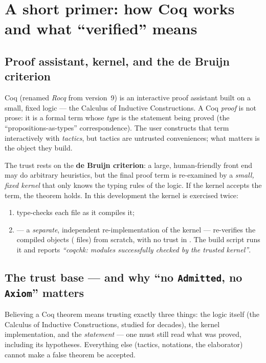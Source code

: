 \documentclass[11pt]{article}
\newcommand{\coq}[1]{\texttt{\detokenize{#1}}}
\begin{document}
\section{A short primer: how Coq works and what ``verified'' means}\label{sec:coq}

\subsection{Proof assistant, kernel, and the de Bruijn criterion}

Coq (renamed \emph{Rocq} from version~9) is an interactive proof assistant
built on a small, fixed logic --- the Calculus of Inductive Constructions. A
Coq \emph{proof} is not prose: it is a formal term whose \emph{type} is the
statement being proved (the ``propositions-as-types'' correspondence). The
user constructs that term interactively with \emph{tactics}, but tactics are
untrusted conveniences; what matters is the object they build.

The trust rests on the \textbf{de Bruijn criterion}: a large, human-friendly
front end may do arbitrary heuristics, but the final proof term is re-examined
by a \emph{small, fixed kernel} that only knows the typing rules of the logic.
If the kernel accepts the term, the theorem holds. In this development the
kernel is exercised twice:
\begin{enumerate}[nosep]
  \item \coq{coqc} type-checks each file as it compiles it;
  \item \coq{coqchk} --- a \emph{separate}, independent re-implementation of
    the kernel --- re-verifies the compiled objects (\coq{.vo} files) from
    scratch, with no trust in \coq{coqc}. The build script runs it and reports
    \emph{``coqchk: modules successfully checked by the trusted kernel''}.
\end{enumerate}

\subsection{The trust base --- and why ``no \texttt{Admitted}, no \texttt{Axiom}'' matters}

Believing a Coq theorem means trusting exactly three things: the logic itself
(the Calculus of Inductive Constructions, studied for decades), the kernel
implementation, and the \emph{statement} --- one must still read what was
proved, including its hypotheses. Everything else (tactics, notations, the
elaborator) cannot make a false theorem be accepted.
\end{document}
